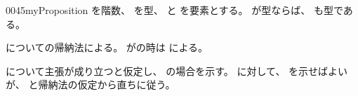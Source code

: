 \documentclass[index]{subfiles}
\begin{document}
\begin{myBlock}{0045}{myProposition}
  を階数、
  を型、
  と
  を要素とする。
  が型ならば、
  も型である。
\end{myBlock}
\begin{myProof}
  についての帰納法による。
  が\myInlineMath{\myTLMinusTwo}の時は
  による。

  について主張が成り立つと仮定し、
  の場合を示す。
  に対して、
  を示せばよいが、
  と帰納法の仮定から直ちに従う。
\end{myProof}
\end{document}
